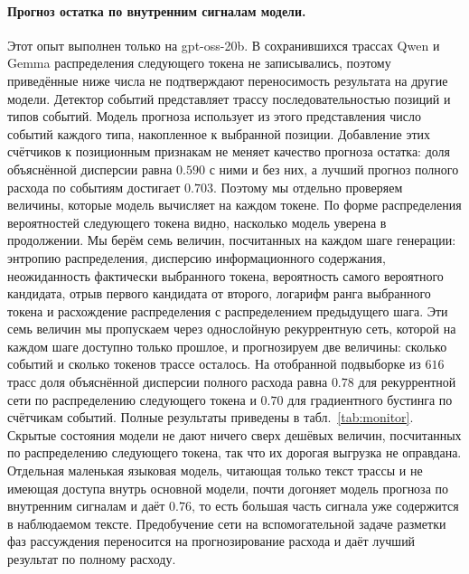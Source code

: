 \documentclass[11pt]{article}
\begin{document}
\paragraph{Прогноз остатка по внутренним сигналам модели.} Этот опыт выполнен только на gpt-oss-20b. В сохранившихся трассах Qwen и Gemma распределения следующего токена не записывались, поэтому приведённые ниже числа не подтверждают переносимость результата на другие модели. Детектор событий представляет трассу последовательностью позиций и типов событий. Модель прогноза использует из этого представления число событий каждого типа, накопленное к выбранной позиции. Добавление этих счётчиков к позиционным признакам не меняет качество прогноза остатка: доля объяснённой дисперсии равна $0.590$ с ними и без них, а лучший прогноз полного расхода по событиям достигает $0.703$. Поэтому мы отдельно проверяем величины, которые модель вычисляет на каждом токене. По форме распределения вероятностей следующего токена видно, насколько модель уверена в продолжении. Мы берём семь величин, посчитанных на каждом шаге генерации: энтропию распределения, дисперсию информационного содержания, неожиданность фактически выбранного токена, вероятность самого вероятного кандидата, отрыв первого кандидата от второго, логарифм ранга выбранного токена и расхождение распределения с распределением предыдущего шага. Эти семь величин мы пропускаем через однослойную рекуррентную сеть, которой на каждом шаге доступно только прошлое, и прогнозируем две величины: сколько событий и сколько токенов трассе осталось. На отобранной подвыборке из $616$ трасс доля объяснённой дисперсии полного расхода равна $0.78$ для рекуррентной сети по распределению следующего токена и $0.70$ для градиентного бустинга по счётчикам событий. Полные результаты приведены в табл.~\ref{tab:monitor}. Скрытые состояния модели не дают ничего сверх дешёвых величин, посчитанных по распределению следующего токена, так что их дорогая выгрузка не оправдана. Отдельная маленькая языковая модель, читающая только текст трассы и не имеющая доступа внутрь основной модели, почти догоняет модель прогноза по внутренним сигналам и даёт $0.76$, то есть большая часть сигнала уже содержится в наблюдаемом тексте. Предобучение сети на вспомогательной задаче разметки фаз рассуждения переносится на прогнозирование расхода и даёт лучший результат по полному расходу.
\end{document}

